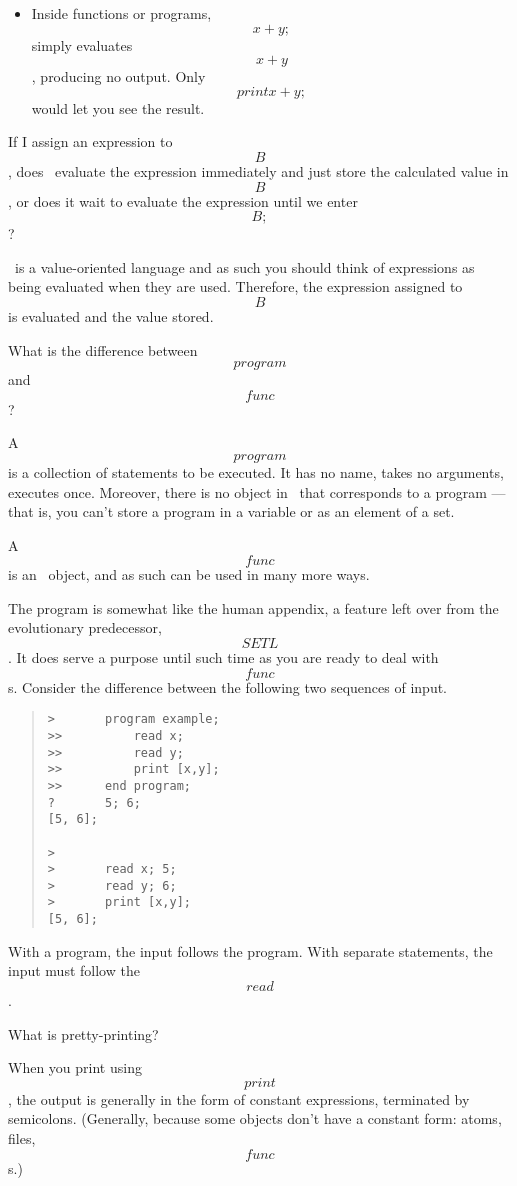 \begin{description}
\begin{itemize}
    \item
    Inside functions or programs, \[x+y;\] simply evaluates \[x+y\], producing
    no output.  Only \[print x+y;\] would let you see the result.
\end{itemize}


\Q  If I assign an expression to \[B\], does \ISETL\ evaluate the
    expression immediately and just store the calculated value
    in \[B\], or does it wait to evaluate the expression 
    until we enter \[B;\] ?


\A \ISETL\ is a value-oriented language and as such you should think of
    expressions as being evaluated when they are used.  Therefore, the
    expression assigned to \[B\] is evaluated and the value stored.

\Q    What is the difference between \[program\] and \[func\]?

\A  A \[program\] is a collection of statements to be executed.
    It has no name, takes no arguments, executes once.  Moreover,
    there is no object in \ISETL\ that corresponds to a program ---
    that is, you can't store a program in a variable or 
    as an element of a set.

    A \[func\] is an \ISETL\ object, and as such can be used in many more
    ways.  

    The program is somewhat like the human appendix, a feature left over
    from the evolutionary predecessor, \[SETL\]\@.  It does serve a purpose
    until such time as you are ready to deal with \[func\]s.  Consider the
    difference between the following two sequences of input.

\begin{quote}\begin{verbatim}
>       program example;
>>          read x;
>>          read y;
>>          print [x,y];
>>      end program;
?       5; 6;
[5, 6];

>       
>       read x; 5;
>       read y; 6;
>       print [x,y];
[5, 6];
\end{verbatim}\end{quote}

    With a program, the input follows the program.
    With separate statements, the input must follow the \[read\].

\Q  What is pretty-printing?\label{pp}

\A  When you print using \[print\], the output is generally in the form of
    constant expressions, terminated by semicolons.  (Generally, because
    some objects don't have a constant form: atoms, files, \[func\]s.)


\end{description}
